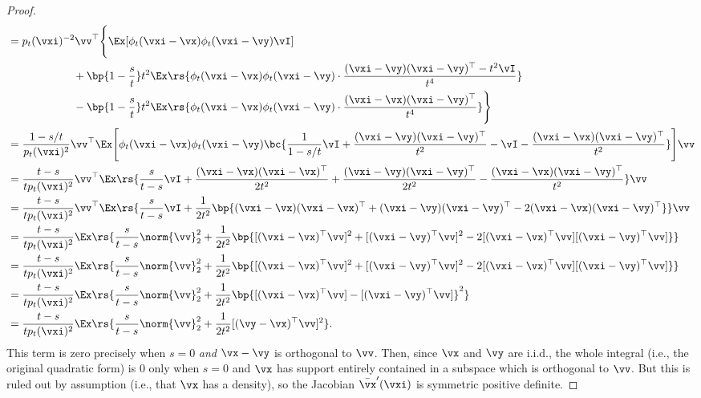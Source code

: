 \documentclass[../../book-main.tex]{subfiles}
\begin{document}
\begin{proof}
\begin{align}
        &= p_{t}(\vxi)^{-2}\vv^{\top}\Bigg\{\Ex[\phi_{t}(\vxi - \vx)\phi_{t}(\vxi - \vy)\vI] \\
        & \qquad \qquad \qquad + \bp{1 - \frac{s}{t}}t^{2}\Ex\rs{\phi_{t}(\vxi - \vx)\phi_{t}(\vxi - \vy)\cdot\frac{(\vxi - \vy)(\vxi - \vy)^{\top} - t^{2}\vI}{t^{4}}} \\
        & \qquad \qquad \qquad -\bp{1 - \frac{s}{t}}t^{2}\Ex\rs{\phi_{t}(\vxi - \vx)\phi_{t}(\vxi - \vy)\cdot\frac{(\vxi - \vx)(\vxi - \vy)^{\top}}{t^{4}}}\Bigg\} \\ 
        &= \frac{1 - s/t}{p_{t}(\vxi)^{2}}\vv^{\top}\Ex\mathopen{}\Bigg[\phi_{t}(\vxi - \vx)\phi_{t}(\vxi - \vy)\bc{\frac{1}{1 - s/t}\vI + \frac{(\vxi - \vy)(\vxi - \vy)^{\top}}{t^{2}} - \vI - \frac{(\vxi - \vx)(\vxi - \vy)^{\top}}{t^{2}}}\Bigg]\vv \\
        &= \frac{t - s}{tp_{t}(\vxi)^{2}}\vv^{\top}\Ex\rs{\frac{s}{t - s}\vI +\frac{(\vxi - \vx)(\vxi - \vx)^{\top}}{2t^{2}} + \frac{(\vxi - \vy)(\vxi - \vy)^{\top}}{2t^{2}} - \frac{(\vxi - \vx)(\vxi - \vy)^{\top}}{t^{2}}}\vv \\
        &= \frac{t - s}{tp_{t}(\vxi)^{2}}\vv^{\top}\Ex\rs{\frac{s}{t - s}\vI +\frac{1}{2t^{2}}\bp{(\vxi - \vx)(\vxi - \vx)^{\top} + (\vxi - \vy)(\vxi - \vy)^{\top} - 2(\vxi - \vx)(\vxi - \vy)^{\top}}}\vv \\
        &= \frac{t - s}{tp_{t}(\vxi)^{2}}\Ex\rs{\frac{s}{t - s}\norm{\vv}_{2}^{2} +\frac{1}{2t^{2}}\bp{[(\vxi - \vx)^{\top}\vv]^{2} + [(\vxi - \vy)^{\top}\vv]^{2} - 2[(\vxi - \vx)^{\top}\vv][(\vxi - \vy)^{\top}\vv]}} \\
        &= \frac{t - s}{tp_{t}(\vxi)^{2}}\Ex\rs{\frac{s}{t - s}\norm{\vv}_{2}^{2} +\frac{1}{2t^{2}}\bp{[(\vxi - \vx)^{\top}\vv]^{2} + [(\vxi - \vy)^{\top}\vv]^{2} - 2[(\vxi - \vx)^{\top}\vv][(\vxi - \vy)^{\top}\vv]}} \\
        &= \frac{t - s}{tp_{t}(\vxi)^{2}}\Ex\rs{\frac{s}{t - s}\norm{\vv}_{2}^{2} +\frac{1}{2t^{2}}\bp{[(\vxi - \vx)^{\top}\vv] - [(\vxi - \vy)^{\top}\vv]}^{2}} \\
        &= \frac{t - s}{tp_{t}(\vxi)^{2}}\Ex\rs{\frac{s}{t - s}\norm{\vv}_{2}^{2} +\frac{1}{2t^{2}}[(\vy - \vx)^{\top}\vv]^{2}}.
    \end{align}
    This term is zero precisely when \(s = 0\) \textit{and} \(\vx - \vy\) is orthogonal to \(\vv\). Then, since \(\vx\) and \(\vy\) are i.i.d., the whole integral (i.e., the original quadratic form) is \(0\) only when \(s = 0\) and \(\vx\) has support entirely contained in a subspace which is orthogonal to \(\vv\). But this is ruled out by assumption (i.e., that \(\vx\) has a density), so the Jacobian \(\bar{\vx}^{\prime}(\vxi)\) is symmetric positive definite.
\end{proof}
\end{document}
